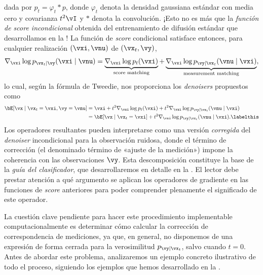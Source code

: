 \documentclass[../../book-main_es.tex]{subfiles}
\begin{document}
dada por $p_t = \varphi_{t} \ast p$, donde $\varphi_{t}$ denota la densidad gaussiana
estándar con media cero y covarianza $t^2 \vI$ y $\ast$ denota
la convolución. ¡Esto no es más que la \textit{función de score incondicional}
obtenida del entrenamiento de difusión estándar que desarrollamos en la
!
La función de \textit{score} condicional satisface entonces, para cualquier realización $(\vxi,
\vnu)$ de $(\vx_t, \vy)$,
\begin{equation}
    \nabla_{\vxi} \log p_{\vx_t \mid \vy}(\vxi\mid \vnu)
    =
    \underbrace{\nabla_{\vxi} \log p_t(\vxi)}_{\text{score matching}}
    +
    \underbrace{\nabla_{\vxi} \log p_{\vy \mid \vx_t}(\vnu \mid
    \vxi)}_{\text{measurement matching}},
    \label{eqn:conditional-denoising-score}
\end{equation}
lo cual, según la fórmula de Tweedie, nos proporciona los \textit{denoisers} propuestos como
\begin{align*}
    \bE[ \vx \mid \vx_t=\vxi, \vy=\vnu]
    &=
    \vxi + t^2 \nabla_{\vxi}\log p_t(\vxi) + t^2 \nabla_{\vxi}\log p_{\vy \mid
    \vx_t}(\vnu \mid \vxi)
    \\
    &=
    \bE[\vx \mid \vx_t=\vxi] + t^2 \nabla_{\vxi}\log p_{\vy \mid \vx_t}(\vnu\mid
    \vxi).
    \labelthis \label{eq:posterior-sampling-denoiser-decomposition}
\end{align*}
Los operadores resultantes pueden interpretarse como una versión \textit{corregida} del
\textit{denoiser} incondicional para la observación ruidosa, donde el término de corrección (el
denominado término de «ajuste de la medición») impone la coherencia con las
observaciones $\vy$. Esta descomposición constituye la base de la \textit{guía del clasificador},
que desarrollaremos en detalle en la . El lector debe prestar atención a qué argumento se aplican los
operadores de gradiente en las funciones de \textit{score} anteriores para poder
comprender plenamente el significado de este operador.

La cuestión clave pendiente para hacer este procedimiento implementable computacionalmente es determinar
cómo calcular la corrección de correspondencia de mediciones, ya que, en general, no
disponemos de una expresión de forma cerrada
para la verosimilitud $p_{\vy \mid \vx_t}$, salvo cuando $t
= 0$. Antes de abordar este problema, analizaremos un ejemplo concreto ilustrativo
de todo el proceso, siguiendo los ejemplos que hemos desarrollado en la
.
\end{document}
